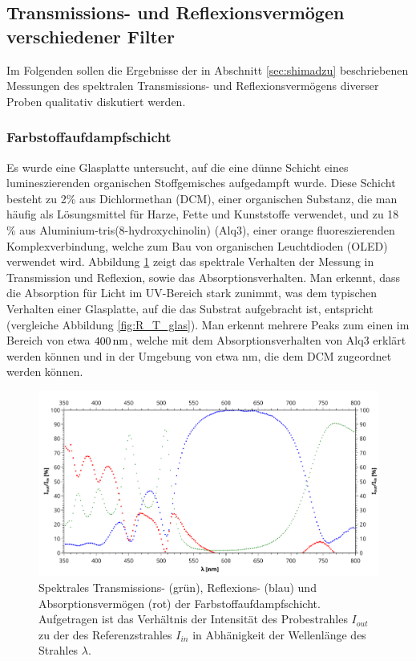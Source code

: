 \subsection{Transmissions- und Reflexionsvermögen verschiedener Filter}
	Im Folgenden sollen die Ergebnisse der in Abschnitt \ref{sec:shimadzu} beschriebenen Messungen des spektralen Transmissions- und Reflexionsvermögens diverser Proben qualitativ diskutiert werden.
	\subsubsection{Farbstoffaufdampfschicht} \label{sec:organisch}
		Es wurde eine Glasplatte untersucht, auf die eine dünne Schicht eines lumineszierenden organischen Stoffgemisches aufgedampft wurde. Diese Schicht besteht zu 2\% aus Dichlormethan (DCM), einer organischen Substanz, die man häufig als Lösungsmittel für Harze, Fette und Kunststoffe verwendet\cite{dcm}, und zu 18 \% aus Aluminium-tris(8-hydroxychinolin) (Alq3), einer orange fluoreszierenden Komplexverbindung, welche zum Bau von organischen Leuchtdioden (OLED) verwendet wird.  Abbildung \ref{fig:TRA_organisch} zeigt das spektrale Verhalten der Messung in Transmission und Reflexion, sowie das Absorptionsverhalten. Man erkennt, dass die Absorption für Licht im UV-Bereich stark zunimmt, was dem typischen Verhalten einer Glasplatte, auf die das Substrat aufgebracht ist, entspricht (vergleiche Abbildung \ref{fig:R_T_glas}). Man erkennt mehrere Peaks zum einen im Bereich von etwa $\unit[400]{nm}$, welche mit dem Absorptionsverhalten von Alq3 erklärt werden können und in der Umgebung von etwa \unit[500]{nm}, die dem DCM zugeordnet werden können.\\
		\begin{figure}[htb]
			\centering
			\includegraphics[width=0.75\linewidth]{pic/TRA_organisch.pdf}
			\caption{Spektrales Transmissions- (grün), Reflexions- (blau) und Absorptionsvermögen (rot) der Farbstoffaufdampfschicht. Aufgetragen ist das Verhältnis der Intensität des Probestrahles $I_{out}$ zu der des Referenzstrahles $I_{in}$ in Abhänigkeit der Wellenlänge des Strahles $\lambda$.}
			\label{fig:TRA_organisch}
		\end{figure} 
